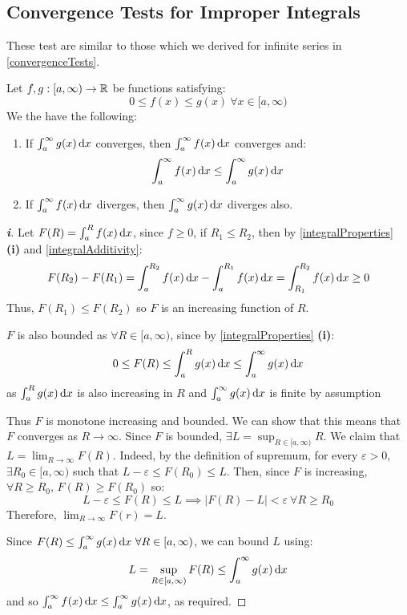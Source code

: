 \documentclass[../main.tex]{subfiles}
\begin{document}
\subsection{Convergence Tests for Improper Integrals}
These test are similar to those which we derived for infinite series in \cref{convergenceTests}.
\begin{proposition}
  Let $f, g: [a, \infty) \to \mathbb{R}$ be functions satisfying: \label{integralComparison}
  \[
    0 \leq f(x) \leq g(x)\ \forall x \in [a, \infty)
  \]
  We the have the following:
  \begin{enumerate}
    \item If $\int_{a}^{\infty} g(x) \d{x}$ converges, then $\int_{a}^{\infty} f(x) \d{x}$ converges and:
      \begin{equation}
        \int_{a}^{\infty} f(x) \d{x}  \leq \int_{a}^{\infty} g(x) \d{x}
      \end{equation}
    \item If $\int_{a}^{\infty} f(x) \d{x}$ diverges, then $\int_{a}^{\infty} g(x) \d{x}$ diverges also.
  \end{enumerate}
\end{proposition}
\begin{proof}[\textbf{i}]
  Let $F(R) = \int_{a}^{R} f(x) \d{x}$, since $f \geq 0$, if $R_1 \leq R_2$, then by \cref{integralProperties} \textbf{(i)} and \cref{integralAdditivity}:
  \[
    F(R_2) - F(R_1) = \int_{a}^{R_2} f(x) \d{x} - \int_{a}^{R_1} f(x) \d{x} = \int_{R_1}^{R_2} f(x) \d{x} \geq 0
  \]
  Thus, $F(R_1) \leq F(R_2)$ so $F$ is an increasing function of $R$.

  $F$ is also bounded as $\forall R \in [a, \infty)$, since by \cref{integralProperties} \textbf{(i)}:
  \[
    0 \leq F(R) \leq \int_{a}^{R} g(x) \d{x} \leq \int_{a}^{\infty} g(x) \d{x}
  \]
  as $\int_{a}^{R} g(x) \d{x}$ is also increasing in $R$ and $\int_{a}^{\infty} g(x) \d{x}$ is finite by assumption

  Thus $F$ is monotone increasing and bounded.
  We can show that this means that $F$ converges as $R \to \infty$.
  Since $F$ is bounded, $\exists L = \sup_{R \in [a, \infty)}  R$.
  We claim that $L = \lim_{R \to \infty} F(R)$.
  Indeed, by the definition of supremum, for every $\varepsilon > 0$, $\exists R_0 \in [a, \infty)$ such that $L - \varepsilon \leq F(R_0) \leq L$.
  Then, since $F$ is increasing, $\forall R \geq R_0$, $F(R) \geq F(R_0)$ so:
  \[
    L - \varepsilon \leq F(R) \leq L \implies |F(R) - L| < \varepsilon\ \forall R \geq R_0
  \]
  Therefore, $\lim_{R \to \infty} F(r) = L$.

  Since $F(R) \leq \int_{a}^{\infty} g(x) \d{x}\ \forall R \in [a, \infty)$, we can bound $L$ using:
  \[
    L = \sup_{R \in [a, \infty)} F(R) \leq \int_{a}^{\infty} g(x) \d{x}
  \]
  and so $\int_{a}^{\infty} f(x) \d{x} \leq \int_{a}^{\infty} g(x) \d{x}$, as required.
\end{proof}
\end{document}
